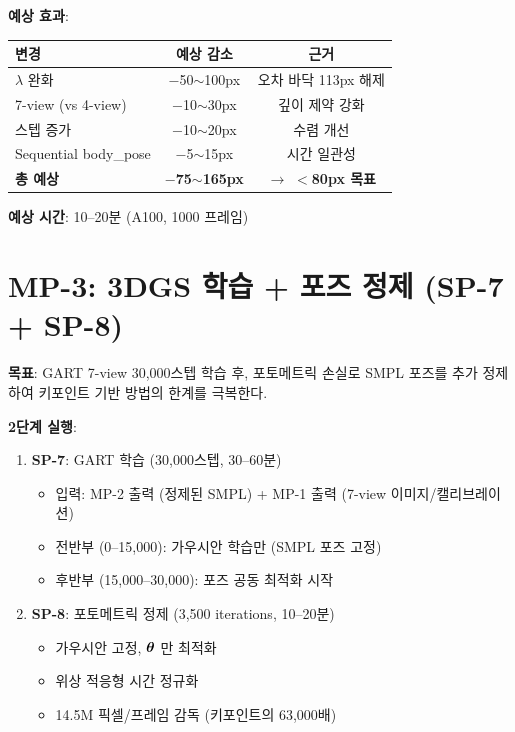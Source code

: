 \documentclass[11pt, a4paper]{report}
\begin{document}
\textbf{예상 효과}:
\begin{center}
\renewcommand{\arraystretch}{1.2}
\begin{tabular}{lcc}
\toprule
\textbf{변경} & \textbf{예상 감소} & \textbf{근거} \\
\midrule
$\lambda$ 완화 & $-$50$\sim$100px & 오차 바닥 113px 해제 \\
7-view (vs 4-view) & $-$10$\sim$30px & 깊이 제약 강화 \\
스텝 증가 & $-$10$\sim$20px & 수렴 개선 \\
Sequential body\_pose & $-$5$\sim$15px & 시간 일관성 \\
\midrule
\textbf{총 예상} & \textbf{$-$75$\sim$165px} & $\to$ \textbf{$<$80px 목표} \\
\bottomrule
\end{tabular}
\end{center}

\textbf{예상 시간}: 10--20분 (A100, 1000 프레임)


\section{MP-3: 3DGS 학습 + 포즈 정제 (SP-7 + SP-8)}

\begin{keyidea}
\textbf{목표}: GART 7-view 30,000스텝 학습 후, 포토메트릭 손실로 SMPL 포즈를 추가 정제하여 키포인트 기반 방법의 한계를 극복한다.
\end{keyidea}

\textbf{2단계 실행}:
\begin{enumerate}
\item \textbf{SP-7}: GART 학습 (30,000스텝, 30--60분)
  \begin{itemize}
  \item 입력: MP-2 출력 (정제된 SMPL) + MP-1 출력 (7-view 이미지/캘리브레이션)
  \item 전반부 (0--15,000): 가우시안 학습만 (SMPL 포즈 고정)
  \item 후반부 (15,000--30,000): 포즈 공동 최적화 시작
  \end{itemize}
\item \textbf{SP-8}: 포토메트릭 정제 (3,500 iterations, 10--20분)
  \begin{itemize}
  \item 가우시안 고정, $\bm{\theta}$ 만 최적화
  \item 위상 적응형 시간 정규화
  \item 14.5M 픽셀/프레임 감독 (키포인트의 63,000배)
  \end{itemize}
\end{enumerate}
\end{document}
